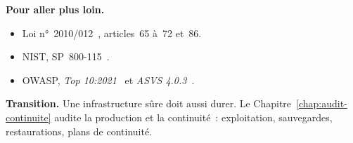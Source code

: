 \bigskip

\begin{boxinfo}
\textbf{Pour aller plus loin.}
\begin{itemize}
    \item Loi n°~2010/012~\cite{loi2010012}, articles~65 à~72 et~86.
    \item NIST, SP~800-115~\cite{nist2008sp800115}.
    \item OWASP, \textit{Top 10:2021}~\cite{owasp2021top10} et
          \textit{ASVS 4.0.3}~\cite{owasp2021asvs}.
\end{itemize}
\end{boxinfo}

\begin{boxinfo}
\textbf{Transition.} Une infrastructure sûre doit aussi durer. Le
Chapitre~\ref{chap:audit-continuite} audite la production et la
continuité~: exploitation, sauvegardes, restaurations, plans de
continuité.
\end{boxinfo}
